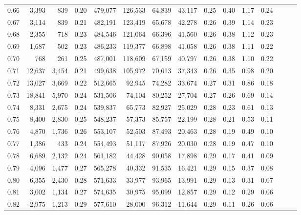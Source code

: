 \begin{tabular}{rrrrrrrrrrrrrrr}
0.66 &   3,393 &    839 &  0.20 &  479,077 &  126,533 &   64,839 &   43,117 &  0.25 &  0.40 &  1.17 &      0.24 \\
0.67 &   3,114 &    839 &  0.21 &  482,191 &  123,419 &   65,678 &   42,278 &  0.26 &  0.39 &  1.14 &      0.23 \\
0.68 &   2,355 &    718 &  0.23 &  484,546 &  121,064 &   66,396 &   41,560 &  0.26 &  0.38 &  1.12 &      0.23 \\
0.69 &   1,687 &    502 &  0.23 &  486,233 &  119,377 &   66,898 &   41,058 &  0.26 &  0.38 &  1.11 &      0.22 \\
0.70 &     768 &    261 &  0.25 &  487,001 &  118,609 &   67,159 &   40,797 &  0.26 &  0.38 &  1.10 &      0.22 \\
0.71 &  12,637 &  3,454 &  0.21 &  499,638 &  105,972 &   70,613 &   37,343 &  0.26 &  0.35 &  0.98 &      0.20 \\
0.72 &  13,027 &  3,669 &  0.22 &  512,665 &   92,945 &   74,282 &   33,674 &  0.27 &  0.31 &  0.86 &      0.18 \\
0.73 &  18,841 &  5,970 &  0.24 &  531,506 &   74,104 &   80,252 &   27,704 &  0.27 &  0.26 &  0.69 &      0.14 \\
0.74 &   8,331 &  2,675 &  0.24 &  539,837 &   65,773 &   82,927 &   25,029 &  0.28 &  0.23 &  0.61 &      0.13 \\
0.75 &   8,400 &  2,830 &  0.25 &  548,237 &   57,373 &   85,757 &   22,199 &  0.28 &  0.21 &  0.53 &      0.11 \\
0.76 &   4,870 &  1,736 &  0.26 &  553,107 &   52,503 &   87,493 &   20,463 &  0.28 &  0.19 &  0.49 &      0.10 \\
0.77 &   1,386 &    433 &  0.24 &  554,493 &   51,117 &   87,926 &   20,030 &  0.28 &  0.19 &  0.47 &      0.10 \\
0.78 &   6,689 &  2,132 &  0.24 &  561,182 &   44,428 &   90,058 &   17,898 &  0.29 &  0.17 &  0.41 &      0.09 \\
0.79 &   4,096 &  1,477 &  0.27 &  565,278 &   40,332 &   91,535 &   16,421 &  0.29 &  0.15 &  0.37 &      0.08 \\
0.80 &   6,355 &  2,430 &  0.28 &  571,633 &   33,977 &   93,965 &   13,991 &  0.29 &  0.13 &  0.31 &      0.07 \\
0.81 &   3,002 &  1,134 &  0.27 &  574,635 &   30,975 &   95,099 &   12,857 &  0.29 &  0.12 &  0.29 &      0.06 \\
0.82 &   2,975 &  1,213 &  0.29 &  577,610 &   28,000 &   96,312 &   11,644 &  0.29 &  0.11 &  0.26 &      0.06 \\

\end{tabular}
